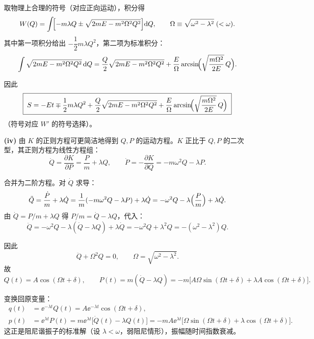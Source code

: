 \begin{question}
\begin{solution}
取物理上合理的符号（对应正向运动），积分得
\[
W(Q)=\int\!\Bigl[-m\lambda Q\pm\sqrt{2mE-m^2\Omega^2 Q^2}\Bigr]\mathrm dQ,
\qquad\Omega\equiv\sqrt{\omega^2-\lambda^2}\;(<\omega).
\]
其中第一项积分给出 \(-\dfrac12 m\lambda Q^2\)，第二项为标准积分：
\[
\int\sqrt{2mE-m^2\Omega^2 Q^2}\,\mathrm dQ
=\frac{Q}{2}\sqrt{2mE-m^2\Omega^2 Q^2}
+\frac{E}{\Omega}\arcsin\!\Bigl(\sqrt{\frac{m\Omega^2}{2E}}\,Q\Bigr).
\]

因此
\[
\boxed{\;
S=-Et\mp\frac12 m\lambda Q^2
+\frac{Q}{2}\sqrt{2mE-m^2\Omega^2 Q^2}
+\frac{E}{\Omega}\arcsin\!\Bigl(\sqrt{\frac{m\Omega^2}{2E}}\,Q\Bigr)
\;}
\]
（符号对应 \(W'\) 的符号选择）。

\noindent\textbf{(iv)} 由 \(K\) 的正则方程可更简洁地得到 \(Q,P\) 的运动方程。\(K\) 正比于 \(Q,P\) 的二次型，其正则方程为线性方程组：
\[
\dot Q=\frac{\partial K}{\partial P}=\frac{P}{m}+\lambda Q,\qquad
\dot P=-\frac{\partial K}{\partial Q}=-m\omega^2 Q-\lambda P .
\]

合并为二阶方程。对 \(\dot Q\) 求导：
\[
\ddot Q=\frac{\dot P}{m}+\lambda\dot Q
=\frac{1}{m}(-m\omega^2 Q-\lambda P)+\lambda\dot Q
=-\omega^2 Q-\lambda\Bigl(\frac{P}{m}\Bigr)+\lambda\dot Q .
\]
由 \(\dot Q=P/m+\lambda Q\) 得 \(P/m=\dot Q-\lambda Q\)，代入：
\[
\ddot Q=-\omega^2 Q-\lambda(\dot Q-\lambda Q)+\lambda\dot Q
=-\omega^2 Q+\lambda^2 Q = -(\omega^2-\lambda^2)Q .
\]

因此
\[
\ddot Q+\Omega^2 Q=0,\qquad\Omega=\sqrt{\omega^2-\lambda^2}.
\]
故
\[
Q(t)=A\cos(\Omega t+\delta),\qquad
P(t)=m(\dot Q-\lambda Q)=-m\bigl[A\Omega\sin(\Omega t+\delta)+\lambda A\cos(\Omega t+\delta)\bigr].
\]

变换回原变量：
\[
\boxed{\;
\begin{aligned}
q(t)&=\ee^{-\lambda t}Q(t)=A \ee^{-\lambda t}\cos(\Omega t+\delta),\\[4pt]
p(t)&=\ee^{\lambda t}P(t)=m \ee^{\lambda t}\bigl[\dot Q(t)-\lambda Q(t)\bigr]
=-m A \ee^{\lambda t}\bigl[\Omega\sin(\Omega t+\delta)+\lambda\cos(\Omega t+\delta)\bigr].
\end{aligned}
\;}
\]
这正是阻尼谐振子的标准解（设 \(\lambda<\omega\)，弱阻尼情形），振幅随时间指数衰减。
\end{solution}
\end{question}

